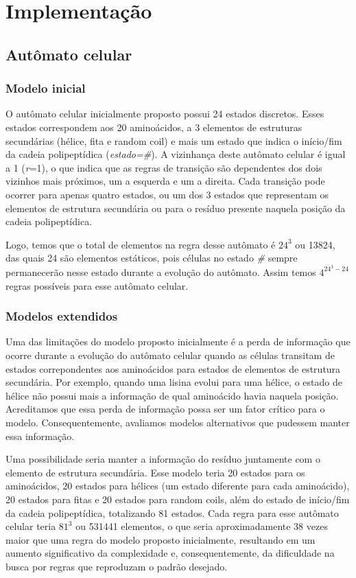 \chapter{Implementação}

\section{Autômato celular}

\subsection{Modelo inicial}

O autômato celular inicialmente proposto possui 24 estados discretos. Esses estados correspondem aos 20 aminoácidos, a 3 elementos de estruturas secundárias (hélice, fita e random coil) e mais um estado que indica o início/fim da cadeia polipeptídica (\textit{estado=\#}). A vizinhança deste autômato celular é igual a 1 (\textit{r}=1),  o que indica que as regras de transição são dependentes dos dois vizinhos mais próximos, um a esquerda e um a direita. Cada transição pode ocorrer para apenas quatro estados, ou um dos 3 estados que representam os elementos de estrutura secundária ou para o resíduo presente naquela posição da cadeia polipeptídica.

Logo, temos que o total de elementos na regra desse autômato é $24^3$ ou 13824, das quais 24 são elementos estáticos, pois células no estado \textit{\#} sempre permanecerão nesse estado durante a evolução do autômato. Assim temos $4^{24^3-24}$ regras possíveis para esse autômato celular.

\subsection{Modelos extendidos}

Uma das limitações do modelo proposto inicialmente é a perda de informação que ocorre durante a evolução do autômato celular quando as células transitam de estados correpondentes aos aminoácidos para estados de elementos de estrutura secundária. Por exemplo, quando uma lisina evolui para uma hélice, o estado de hélice não possui mais a informação de qual aminoácido havia naquela posição. Acreditamos que essa perda de informação possa ser um fator crítico para o modelo. Consequentemente, avaliamos modelos alternativos que pudessem manter essa informação. 

Uma possibilidade seria manter a informação do resíduo juntamente com o elemento de estrutura secundária. Esse modelo teria 20 estados para os aminoácidos, 20 estados para hélices (um estado diferente para cada aminoácido), 20 estados para fitas e 20 estados para random coils, além do estado de início/fim da cadeia polipeptídica, totalizando 81 estados. Cada regra para esse autômato celular teria $81^3$  ou 531441 elementos, o que seria aproximadamente 38 vezes maior que uma regra do modelo proposto inicialmente, resultando em um aumento significativo da complexidade e, consequentemente, da dificuldade na busca por regras que reproduzam o padrão desejado.

